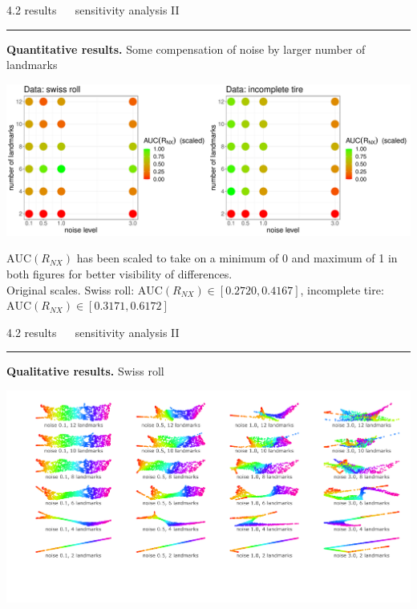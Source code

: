 \documentclass[11pt, compress, t, notes = noshow, xcolor = table, 
aspectratio = 1610]{beamer}
\begin{document}

\LARGE
\begin{frame}{\textcolor{gray!90}{4.2 results} ~~ sensitivity analysis II}
\normalsize
\vspace{-0.5cm}
\noindent \textcolor{gray!90}{\rule{\textwidth}{1pt}}
\smallskip

\textbf{Quantitative results.} Some compensation of noise by larger number of 
landmarks

\vspace{0.3cm}

\includegraphics[trim = 0 0 0 0, clip, %
    width = \textwidth]{figures/sensitivity_noise_auc}

\vspace{0.3cm}

\scriptsize
$\text{AUC}(R_{NX})$ has been scaled to take on a minimum of 0 and maximum of 1 
in both figures for better visibility of differences. \\
Original scales. Swiss roll: $\text{AUC}(R_{NX}) \in [0.2720, 0.4167]$, 
incomplete tire: $\text{AUC}(R_{NX}) \in [0.3171, 0.6172]$

\end{frame}


\LARGE
\begin{frame}{\textcolor{gray!90}{4.2 results} ~~ sensitivity analysis II}
\normalsize
\vspace{-0.5cm}
\noindent \textcolor{gray!90}{\rule{\textwidth}{1pt}}
\smallskip

\textbf{Qualitative results.} Swiss roll

\vspace{0.3cm}

\includegraphics[trim = 40 60 0 0, clip, %
    width = \textwidth]{figures/sensitivity_noise_qual_swiss}

\end{frame}
\end{document}
